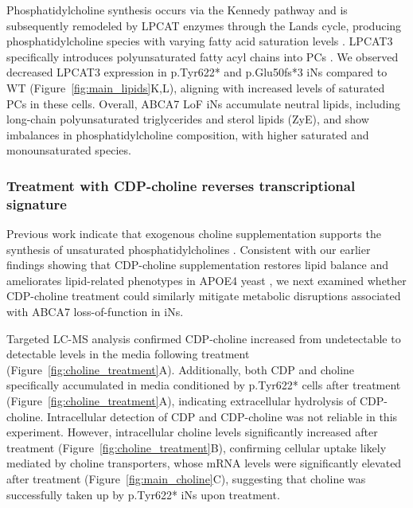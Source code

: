 Phosphatidylcholine synthesis occurs via the Kennedy pathway and is subsequently remodeled by LPCAT enzymes through the Lands cycle, producing phosphatidylcholine species with varying fatty acid saturation levels \cite{Boumann2003-ew;Wang2019-om}. LPCAT3 specifically introduces polyunsaturated fatty acyl chains into PCs \cite{Zhao2008-pq}. We observed decreased LPCAT3 expression in p.Tyr622* and p.Glu50fs*3 iNs compared to WT (Figure~\ref{fig:main_lipids}K,L), aligning with increased levels of saturated PCs in these cells. Overall, ABCA7 LoF iNs accumulate neutral lipids, including long-chain polyunsaturated triglycerides and sterol lipids (ZyE), and show imbalances in phosphatidylcholine composition, with higher saturated and monounsaturated species.


\subsubsection{Treatment with CDP-choline reverses transcriptional signature}
Previous work indicate that exogenous choline supplementation supports the synthesis of unsaturated phosphatidylcholines \cite{Boumann2003-ew}. Consistent with our earlier findings showing that CDP-choline supplementation restores lipid balance and ameliorates lipid-related phenotypes in APOE4 yeast \cite{Sienski2021-zt}, we next examined whether CDP-choline treatment could similarly mitigate metabolic disruptions associated with ABCA7 loss-of-function in iNs.


Targeted LC-MS analysis confirmed CDP-choline increased from undetectable to detectable levels in the media following treatment (Figure~\ref{fig:choline_treatment}A). Additionally, both CDP and choline specifically accumulated in media conditioned by p.Tyr622* cells after treatment (Figure~\ref{fig:choline_treatment}A), indicating extracellular hydrolysis of CDP-choline. Intracellular detection of CDP and CDP-choline was not reliable in this experiment. However, intracellular choline levels significantly increased after treatment (Figure~\ref{fig:choline_treatment}B), confirming cellular uptake likely mediated by choline transporters, whose mRNA levels were significantly elevated after treatment (Figure~\ref{fig:main_choline}C), suggesting that choline was successfully taken up by p.Tyr622* iNs upon treatment. 

